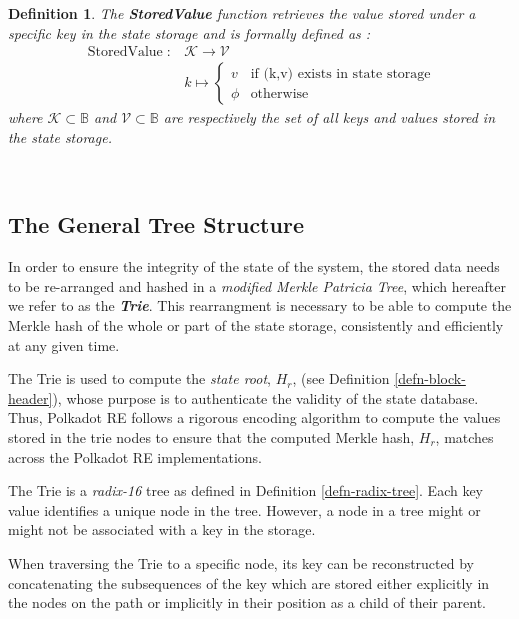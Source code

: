 \documentclass{book}
\newcommand{\tmem}[1]{{\em #1\/}}
\newcommand{\tmop}[1]{\ensuremath{\operatorname{#1}}}
\newcommand{\tmstrong}[1]{\textbf{#1}}
\newcommand{\tmtextbf}[1]{{\bfseries{#1}}}
\newcommand{\tmtextit}[1]{{\itshape{#1}}}
\newtheorem{definition}{Definition}
\providecommand{\tmem}[1]{\tmtextit{#1}}
\providecommand{\tmop}[1]{\ensuremath{\mathrm{#1}}}
\providecommand{\tmstrong}[1]{\tmtextbf{#1}}
\providecommand{\tmtextbf}[1]{\tmtextbf{#1}}
\providecommand{\tmtextit}[1]{\tmtextit{#1}}
\newtheorem{definition}{Definition}
\begin{document}
\begin{definition}
  \label{defn-stored-value}The \label{autolab24}{\tmstrong{StoredValue}}
  function retrieves the value stored under a specific key in the state
  storage and is formally defined as :
  \[ \begin{array}{cc}
       \tmop{StoredValue} : & \mathcal{K} \rightarrow \mathcal{V}\\
       & k \mapsto \left\{ \begin{array}{cc}
         v & \text{if (k,v) exists in state storage}\\
         \phi & \tmop{otherwise}
       \end{array} \right.
     \end{array} \]
  where $\mathcal{K} \subset \mathbb{B}$ and $\mathcal{V} \subset \mathbb{B}$
  are respectively the set of all keys and values stored in the state storage.
  
  \ 
\end{definition}

\subsection{The General Tree Structure}

In order to ensure the integrity of the state of the system, the stored data
needs to be re-arranged and hashed in a {\tmem{modified Merkle Patricia
Tree}}, which hereafter we refer to as the {\tmem{{\tmstrong{Trie}}}}. This
rearrangment is necessary to be able to compute the Merkle hash of the whole
or part of the state storage, consistently and efficiently at any given time.

The Trie is used to compute the {\tmem{state root}}, $H_r$, (see Definition
\ref{defn-block-header}), whose purpose is to authenticate the validity of the
state database. Thus, Polkadot RE follows a rigorous encoding algorithm to
compute the values stored in the trie nodes to ensure that the computed Merkle
hash, $H_r$, matches across the Polkadot RE implementations.

The Trie is a {\tmem{radix-16}} tree as defined in Definition
\ref{defn-radix-tree}. Each key value identifies a unique node in the tree.
However, a node in a tree might or might not be associated with a key in the
storage.

When traversing the Trie to a specific node, its key can be reconstructed by
concatenating the subsequences of the key which are stored either explicitly
in the nodes on the path or implicitly in their position as a child of their
parent.
\end{document}
